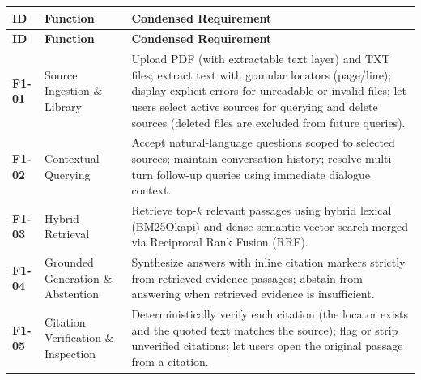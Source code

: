 \begin{longtable}{>{\raggedright\arraybackslash}p{}>{\raggedright\arraybackslash}p{}>{\raggedright\arraybackslash}p{}}

\hline

\rowcolor{tablehead}

\textbf{ID} & \textbf{Function} & \textbf{Condensed Requirement} \\ \hline

\endfirsthead

\hline

\rowcolor{tablehead}

\textbf{ID} & \textbf{Function} & \textbf{Condensed Requirement} \\ \hline

\endhead

\endfoot

\endlastfoot

\textbf{F1-01} & Source Ingestion \& Library & Upload PDF (with extractable text layer) and TXT files; extract text with granular locators (page/line); display explicit errors for unreadable or invalid files; let users select active sources for querying and delete sources (deleted files are excluded from future queries). \\ \hline

\textbf{F1-02} & Contextual Querying & Accept natural-language questions scoped to selected sources; maintain conversation history; resolve multi-turn follow-up queries using immediate dialogue context. \\ \hline

\textbf{F1-03} & Hybrid Retrieval & Retrieve top-$k$ relevant passages using hybrid lexical (BM25Okapi) and dense semantic vector search merged via Reciprocal Rank Fusion (RRF). \\ \hline

\textbf{F1-04} & Grounded Generation \& Abstention & Synthesize answers with inline citation markers strictly from retrieved evidence passages; abstain from answering when retrieved evidence is insufficient. \\ \hline

\textbf{F1-05} & Citation Verification \& Inspection & Deterministically verify each citation (the locator exists and the quoted text matches the source); flag or strip unverified citations; let users open the original passage from a citation. \\ \hline

\end{longtable}

